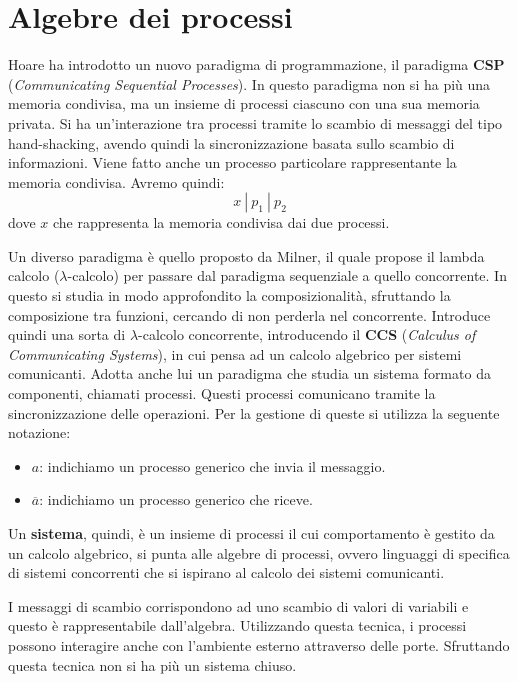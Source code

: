 \section{Algebre dei processi}
Hoare ha introdotto un nuovo paradigma di programmazione, il paradigma \textbf{CSP}
(\textit{Communicating Sequential Processes}). In questo paradigma non si ha
più una memoria condivisa, ma un insieme di processi ciascuno con una sua memoria
privata. Si ha un'interazione tra processi tramite lo scambio di messaggi del
tipo hand-shacking, avendo quindi la sincronizzazione basata sullo scambio
di informazioni. Viene fatto anche un processo particolare rappresentante la memoria
condivisa. Avremo quindi:
\begin{equation}
    x \ | \ p_1 \ | \ p_2
\end{equation}
dove $x$ che rappresenta la memoria condivisa dai due processi.

Un diverso paradigma è quello proposto da Milner, il quale propose il lambda
calcolo ($\lambda$-calcolo) per passare dal paradigma sequenziale a quello
concorrente. In questo si studia in modo approfondito la composizionalità, sfruttando
la composizione tra funzioni, cercando di non perderla nel concorrente.
Introduce quindi una sorta di $\lambda$-calcolo concorrente, introducendo il
\textbf{CCS} (\textit{Calculus of Communicating Systems}), in cui pensa ad un
calcolo algebrico per sistemi comunicanti. Adotta anche lui un paradigma che
studia un sistema formato da componenti, chiamati processi. Questi processi
comunicano tramite la sincronizzazione delle operazioni. Per la gestione di queste
si utilizza la seguente notazione:
\begin{itemize}
    \item \textbf{$a$}: indichiamo un processo generico che invia il messaggio.
    \item \textbf{$\overline{a}$}: indichiamo un processo generico che riceve.
\end{itemize}
Un \textbf{sistema}, quindi, è un insieme di processi il cui comportamento è gestito da
un calcolo algebrico, si punta alle algebre di processi, ovvero linguaggi di
specifica di sistemi concorrenti che si ispirano al calcolo dei sistemi comunicanti.

I messaggi di scambio corrispondono ad uno scambio di valori di variabili e questo
è rappresentabile dall'algebra. Utilizzando questa tecnica, i processi possono
interagire anche con l'ambiente esterno attraverso delle porte. Sfruttando
questa tecnica non si ha più un sistema chiuso.

